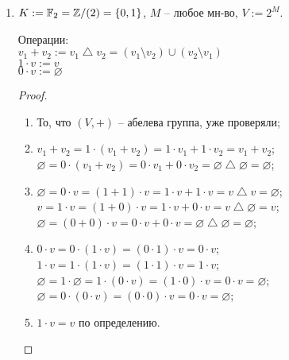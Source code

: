 \begin{enumerate}
    \item $K := \mathbb{F}_2 = \mathbb{Z} / (2) = \{0, 1\}$, $M$ -- 
    любое мн-во, $V := 2^M$.

    Операции:\\
    $v_1 + v_2 := v_1 \bigtriangleup v_2 = (v_1 \setminus v_2) \cup
    (v_2 \setminus v_1)$\\
    $1 \cdot v := v$\\
    $0 \cdot v := \varnothing$

    \begin{proof} $ $

        \begin{enumerate}
            \item То, что $(V, +)$ -- абелева группа, уже проверяли;
            
            \item 
            $v_1 + v_2 = 1 \cdot (v_1 + v_2) = 1 \cdot v_1 +
            1 \cdot v_2 = v_1 + v_2$;\\
            $\varnothing = 0 \cdot (v_1 + v_2) = 0 \cdot v_1 +
            0 \cdot v_2 = \varnothing \bigtriangleup \varnothing =
            \varnothing$;

            \item 
            $\varnothing = 0 \cdot v = (1 + 1) \cdot v =
            1 \cdot v + 1 \cdot v = v \bigtriangleup v = \varnothing$; \\
            $v = 1 \cdot v = (1 + 0) \cdot v = 1 \cdot v + 0 \cdot v =
            v \bigtriangleup \varnothing = v$; \\
            $\varnothing = (0 + 0) \cdot v = 0 \cdot v + 0 \cdot v =
            \varnothing \bigtriangleup \varnothing = \varnothing$;

            \item 
            $0 \cdot v = 0 \cdot (1 \cdot v) = (0 \cdot 1) \cdot v =
            0 \cdot v$; \\
            $1 \cdot v = 1 \cdot (1 \cdot v) = (1 \cdot 1) \cdot v =
            1 \cdot v $; \\
            $\varnothing = 1 \cdot \varnothing = 1 \cdot (0 \cdot v) =
            (1 \cdot 0) \cdot v = 0 \cdot v = \varnothing$; \\
            $\varnothing = 0 \cdot (0 \cdot v) = (0 \cdot 0) \cdot v =
            0 \cdot v = \varnothing$;

            \item $1 \cdot v = v$ по определению.
        \end{enumerate}
    \end{proof}
\end{enumerate}